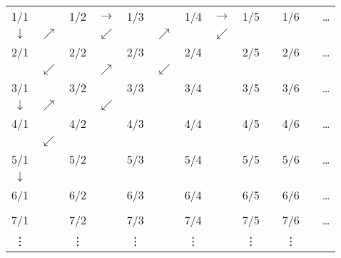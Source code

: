 \documentclass{article}
\begin{document}
\newcommand{\f}[2]{#1/#2} 

\newcommand{\ra}{\ensuremath{\rightarrow}} 

\newcommand{\da}{\ensuremath{\downarrow}} 

\newcommand{\nea}{\ensuremath{\nearrow}} 

\newcommand{\swa}{\ensuremath{\swarrow}}

\begin{tabular}{ccccccccccccc} 

 \f{1}{1}	& 		&\f{1}{2}	&\ra  	&\f{1}{3}	& 		&\f{1}{4}	& \ra 	&\f{1}{5}	& 		&\f{1}{6} 	& 	&\ldots\\[6pt]

 \da		&\nea 	&        	&\swa &        		&\nea 	&        	&\swa 	&        	&	 	&        	& 	&	      \\[6pt]

 \f{2}{1}& &\f{2}{2}& &\f{2}{3}& &\f{2}{4}& &\f{2}{5}& &\f{2}{6}& &\ldots\\[6pt]

		 &  \swa      & & \nea       & & \swa       & &        & &        & &      \\[6pt]

 \f{3}{1}& &\f{3}{2}& &\f{3}{3}& &\f{3}{4}& &\f{3}{5}& &\f{3}{6}& &\ldots\\[6pt]

 \da		&\nea &        &\swa &        & &        & &        & &        & &      \\[6pt]

 \f{4}{1}& &\f{4}{2}& &\f{4}{3}& &\f{4}{4}& &\f{4}{5}& &\f{4}{6}& &\ldots\\[6pt]

				& \swa&        & &        & &        & &        & &        & &      \\[6pt]
 
 \f{5}{1}& &\f{5}{2}& &\f{5}{3}& &\f{5}{4}& &\f{5}{5}& &\f{5}{6}& &\ldots\\[6pt]

				\da	& &        & &        & &        & &        & &        & &      \\[6pt]
 
 \f{6}{1}& &\f{6}{2}& &\f{6}{3}& &\f{6}{4}& &\f{6}{5}& &\f{6}{6}& &\ldots\\[6pt]

		 &        & &        & &        & &        & &        & &      \\[6pt]
 
 \f{7}{1}& &\f{7}{2}& &\f{7}{3}& &\f{7}{4}& &\f{7}{5}& &\f{7}{6}	& &\ldots\\[6pt]

 
 \vdots &&\vdots  &&\vdots  &&\vdots  &&\vdots  &&\vdots  &&\\

\end{tabular}
\end{document}
